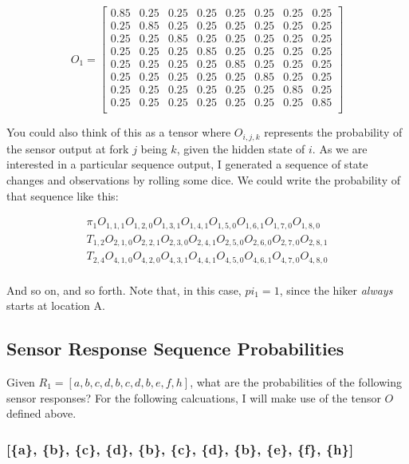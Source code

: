 \documentclass{article}
\begin{document}
$$
O_1 = \begin{bmatrix}
0.85 & 0.25 & 0.25 & 0.25 & 0.25 & 0.25 & 0.25 & 0.25 \\
0.25 & 0.85 & 0.25 & 0.25 & 0.25 & 0.25 & 0.25 & 0.25 \\
0.25 & 0.25 & 0.85 & 0.25 & 0.25 & 0.25 & 0.25 & 0.25 \\
0.25 & 0.25 & 0.25 & 0.85 & 0.25 & 0.25 & 0.25 & 0.25 \\
0.25 & 0.25 & 0.25 & 0.25 & 0.85 & 0.25 & 0.25 & 0.25 \\
0.25 & 0.25 & 0.25 & 0.25 & 0.25 & 0.85 & 0.25 & 0.25 \\
0.25 & 0.25 & 0.25 & 0.25 & 0.25 & 0.25 & 0.85 & 0.25 \\
0.25 & 0.25 & 0.25 & 0.25 & 0.25 & 0.25 & 0.25 & 0.85 \\
\end{bmatrix}
$$

You could also think of this as a tensor where $O_{i, j, k}$ represents the 
probability of the sensor output at fork $j$ being $k$, given the hidden state of $i$. As 
we are interested in a particular sequence output, I generated a sequence of 
state changes and observations by rolling some dice. We 
could write the probability of that sequence like this:

$$
\begin{gathered}
\pi_1    O_{1, 1, 1} O_{1, 2, 0} O_{1, 3, 1} O_{1, 4, 1} O_{1, 5, 0} O_{1, 6, 1} O_{1, 7, 0} O_{1, 8, 0} \\
T_{1, 2} O_{2, 1, 0} O_{2, 2, 1} O_{2, 3, 0} O_{2, 4, 1} O_{2, 5, 0} O_{2, 6, 0} O_{2, 7, 0} O_{2, 8, 1} \\
T_{2, 4} O_{4, 1, 0} O_{4, 2, 0} O_{4, 3, 1} O_{4, 4, 1} O_{4, 5, 0} O_{4, 6, 1} O_{4, 7, 0} O_{4, 8, 0} \\
\end{gathered}
$$

And so on, and so forth. Note that, in this case, $pi_1 = 1$, since the hiker 
\textit{always} starts at location A.

\subsection{Sensor Response Sequence Probabilities}

Given $R_1 = [a, b, c, d, b, c, d, b, e, f, h]$, what are the probabilities of 
the following sensor responses? For the following calcuations, I will make use 
of the tensor $O$ defined above.

\subsubsection{[\{a\}, \{b\}, \{c\}, \{d\}, \{b\}, \{c\}, \{d\}, \{b\}, \{e\}, \{f\}, \{h\}]}
\end{document}
